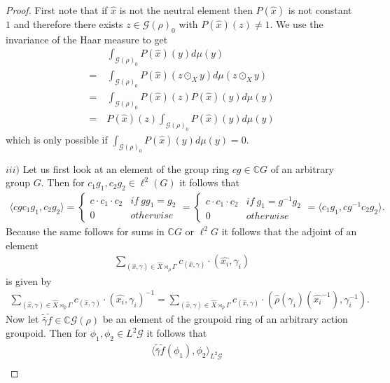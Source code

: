 \documentclass[12pt,a4paper]{scrartcl}
\theoremstyle{plain}
\theoremstyle{definition}
\numberwithin{equation}{section}
\newcommand{\C}{\mathbb{C}} %
\newcommand{\2}{\mathbb{Z} / 2 \mathbb{Z}}
\newcommand{\G}{\mathcal{G}}
\newcommand{\1}{\bar{1}}
\newcommand{\0}{\bar{0}}
\begin{document}
\begin{proof}
	First note that if $\hat{x}$ is not the neutral element then $P(\hat{x})$ is not constant $1$ and therefore there exists $z \in \G(\rho)_0$ with $P(\hat{x})(z) \neq 1$. We use the invariance of the Haar measure to get
	\begin{align*}
		 &~ \int_{\G(\rho)_0} P(\hat{x})(y) d\mu(y) \\
		=&~ \int_{\G(\rho)_0} P(\hat{x})(z \odot_{X} y) d\mu(z \odot_{X} y) \\
		=&~ \int_{\G(\rho)_0} P(\hat{x})(z) P(\hat{x})(y) d\mu(y) \\
		=&~ P(\hat{x})(z) \int_{\G(\rho)_0} P(\hat{x})(y) d\mu(y)
	\end{align*}
	which is only possible if $\int_{\G(\rho)_0} P(\hat{x})(y) d\mu(y) = 0$.
	
	$iii)$ Let us first look at an element of the group ring $c g \in \C G$ of an arbitrary group $G$. Then for $c_1 g_1, c_2 g_2 \in \ell^2(G)$ it follows that 
	\begin{align*}
		\langle c g c_1 g_1, c_2 g_2 \rangle = \begin{cases}
		 	c \cdot c_1 \cdot c_2 & if \ g g_1 = g_2 \\
		 	0 & otherwise
		\end{cases}  = \begin{cases}
		c \cdot c_1 \cdot c_2 & if \ g_1 = g^{-1} g_2 \\
		0 & otherwise
		\end{cases}
		= \langle  c_1 g_1, c g^{-1} c_2 g_2 \rangle.
	\end{align*}
	Because the same follows for sums in $\C G$ or $\ell^2 G$ it follows that the adjoint of an element 
	\begin{align*}
		\sum_{(\hat{x}, \gamma) \in \hat{X} \rtimes_{\hat{\rho}} \Gamma} c_{(\hat{x}, \gamma)} \cdot (\hat{x_i}, \gamma_i)
	\end{align*}
	is given by 
	\begin{align*}
		\sum_{(\hat{x}, \gamma) \in \hat{X} \rtimes_{\hat{\rho}} \Gamma} c_{(\hat{x}, \gamma)} \cdot (\hat{x_i}, \gamma_i)^{-1} = \sum_{(\hat{x}, \gamma) \in \hat{X} \rtimes_{\hat{\rho}} \Gamma} c_{(\hat{x}, \gamma)} \cdot (\hat{\rho}(\gamma_i)(\hat{x_i}^{-1}), \gamma_i^{-1}).
	\end{align*}
	Now let $\tilde{\bar{\gamma}} \tilde{f} \in \C \G(\rho)$ be an element of the groupoid ring of an arbitrary action groupoid. Then for $\phi_1, \phi_2 \in L^2 \G$ it follows that
	\begin{align*}
		 &~ \langle \tilde{\bar{\gamma}} \tilde{f} (\phi_1), \phi_2 \rangle_{L^2 \G} \\

\end{align*}
\end{proof}
\end{document}
